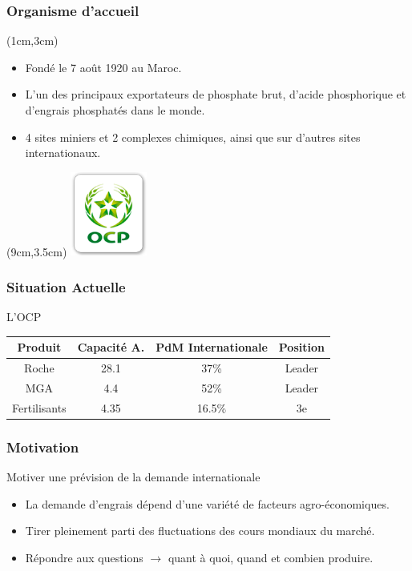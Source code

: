 \documentclass{beamer}
\begin{document}
\begin{frame}
	\frametitle{Organisme d’accueil}
	\begin{textblock*}{7cm}(1cm,3cm)
		\begin{itemize}
			\item Fondé le 7 août 1920 au Maroc.
			\item L'un des principaux exportateurs de phosphate brut, d’acide phosphorique et d’engrais phosphatés dans le monde.
			\item 4 sites miniers et 2 complexes chimiques, ainsi que sur d'autres sites internationaux.
		\end{itemize}
	\end{textblock*}
	
	\begin{textblock*}{5cm}(9cm,3.5cm) %
		\includegraphics[width=2.5cm]{logo-ocp}
	\end{textblock*}
\end{frame}

\begin{frame}
\frametitle{Situation Actuelle}
\begin{block}{L'OCP}
\begin{table}
\centering 
  \begin{tabular}{|c|c|c|c|}
  \hline
  \small{Produit} & \small{Capacité A.} & \small{PdM Internationale} & \small{Position} \\
  \hline
  Roche & 28.1 & 37\% & Leader\\
  MGA & 4.4 & 52\% & Leader\\
  Fertilisants & 4.35 & 16.5\% & 3e\\
  \hline
  \end{tabular}
  \end{table}
  \end{block} 
\end{frame}

\begin{frame}
  \frametitle{Motivation}
  \begin{block}{Motiver une prévision de la demande internationale}
    \begin{itemize}
    \item La demande d'engrais dépend d'une variété de facteurs agro-économiques.
    \item Tirer pleinement parti des fluctuations des cours mondiaux du marché. %
    \item  Répondre aux questions $\rightarrow$ quant à quoi, quand et combien produire.
    \end{itemize}
    \end{block}
\end{frame}
\end{document}
